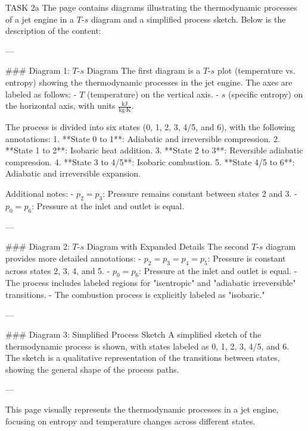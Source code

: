 TASK 2a  
The page contains diagrams illustrating the thermodynamic processes of a jet engine in a \( T \)-\( s \) diagram and a simplified process sketch. Below is the description of the content:

---

### Diagram 1: \( T \)-\( s \) Diagram  
The first diagram is a \( T \)-\( s \) plot (temperature vs. entropy) showing the thermodynamic processes in the jet engine. The axes are labeled as follows:  
- \( T \) (temperature) on the vertical axis.  
- \( s \) (specific entropy) on the horizontal axis, with units \( \frac{\text{kJ}}{\text{kg·K}} \).  

The process is divided into six states (0, 1, 2, 3, 4/5, and 6), with the following annotations:  
1. **State 0 to 1**: Adiabatic and irreversible compression.  
2. **State 1 to 2**: Isobaric heat addition.  
3. **State 2 to 3**: Reversible adiabatic compression.  
4. **State 3 to 4/5**: Isobaric combustion.  
5. **State 4/5 to 6**: Adiabatic and irreversible expansion.  

Additional notes:  
- \( p_2 = p_3 \): Pressure remains constant between states 2 and 3.  
- \( p_0 = p_6 \): Pressure at the inlet and outlet is equal.  

---

### Diagram 2: \( T \)-\( s \) Diagram with Expanded Details  
The second \( T \)-\( s \) diagram provides more detailed annotations:  
- \( p_2 = p_3 = p_4 = p_5 \): Pressure is constant across states 2, 3, 4, and 5.  
- \( p_0 = p_6 \): Pressure at the inlet and outlet is equal.  
- The process includes labeled regions for "isentropic" and "adiabatic irreversible" transitions.  
- The combustion process is explicitly labeled as "isobaric."  

---

### Diagram 3: Simplified Process Sketch  
A simplified sketch of the thermodynamic process is shown, with states labeled as 0, 1, 2, 3, 4/5, and 6. The sketch is a qualitative representation of the transitions between states, showing the general shape of the process paths.

---

This page visually represents the thermodynamic processes in a jet engine, focusing on entropy and temperature changes across different states.